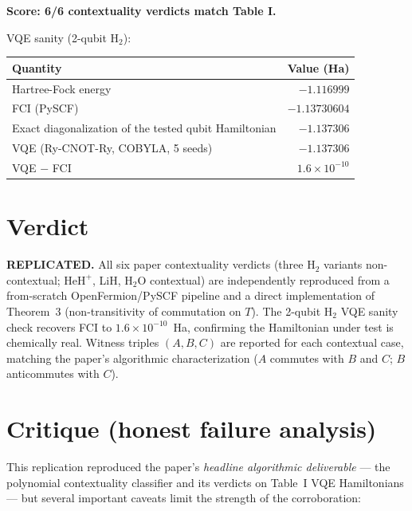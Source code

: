 \documentclass[11pt]{article}
\begin{document}
\textbf{Score: 6/6 contextuality verdicts match Table I.}

VQE sanity (2-qubit $\mathrm{H}_2$):
\begin{center}
\begin{tabular}{@{}lr@{}}
\toprule
Quantity & Value (Ha) \\
\midrule
Hartree-Fock energy & $-1.116999$ \\
FCI (PySCF) & $-1.13730604$ \\
Exact diagonalization of the tested qubit Hamiltonian & $-1.137306$ \\
VQE (Ry-CNOT-Ry, COBYLA, 5 seeds) & $-1.137306$ \\
VQE $-$ FCI & $1.6\times10^{-10}$ \\
\bottomrule
\end{tabular}
\end{center}

\section{Verdict}

\textbf{REPLICATED.} All six paper contextuality verdicts (three
$\mathrm{H}_2$ variants non-contextual; $\mathrm{HeH}^+$, LiH,
$\mathrm{H}_2\mathrm{O}$ contextual) are independently reproduced from a
from-scratch OpenFermion/PySCF pipeline and a direct implementation of
Theorem~3 (non-transitivity of commutation on $T$). The 2-qubit $\mathrm{H}_2$
VQE sanity check recovers FCI to $1.6\times10^{-10}$~Ha, confirming the
Hamiltonian under test is chemically real. Witness triples $(A,B,C)$ are
reported for each contextual case, matching the paper's algorithmic
characterization ($A$ commutes with $B$ and $C$; $B$ anticommutes with $C$).

\section{Critique (honest failure analysis)}

This replication reproduced the paper's \emph{headline algorithmic
deliverable} --- the polynomial contextuality classifier and its verdicts
on Table~I VQE Hamiltonians --- but several important caveats limit the
strength of the corroboration:
\end{document}
